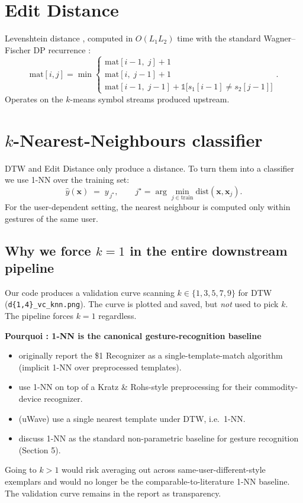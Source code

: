 \documentclass[11pt,a4paper]{article}
\newenvironment{whybox}[1]{%
    \begin{shaded*}\noindent\textbf{Pourquoi : #1}\par\vspace{0.3em}}
    {\end{shaded*}}
\renewenvironment{shaded*}
    {\definecolor{shadecolor}{named}{whyboxbg}\begin{shaded}}
    {\end{shaded}}
\begin{document}
\section{Edit Distance}

Levenshtein distance \cite{levenshtein1966edit}, computed in $O(L_1
L_2)$ time with the standard Wagner--Fischer DP recurrence
\cite{wagner1974string}:
\[
\text{mat}[i,j]=\min\begin{cases}
    \text{mat}[i{-}1,\;j]+1\\
    \text{mat}[i,\;j{-}1]+1\\
    \text{mat}[i{-}1,\;j{-}1]+ \mathbb{1}\!\bigl[s_1[i{-}1]\ne s_2[j{-}1]\bigr]
\end{cases}.
\]
Operates on the $k$-means symbol streams produced upstream.

\section{$k$-Nearest-Neighbours classifier}\label{sec:knn}

DTW and Edit Distance only produce a distance. To turn them into a
classifier we use 1-NN over the training set:
\[
\hat{y}(\mathbf{x}) \;=\; y_{\,j^\star}, \qquad
j^\star = \arg\min_{j\in\text{train}} \mathrm{dist}(\mathbf{x},\mathbf{x}_j).
\]
For the user-dependent setting, the nearest neighbour is computed only
within gestures of the same user.

\subsection{Why we force $k=1$ in the entire downstream pipeline}

Our code produces a validation curve scanning
$k\in\{1,3,5,7,9\}$ for DTW (\texttt{d\{1,4\}\_vc\_knn.png}). The
curve is plotted and saved, but \emph{not} used to pick $k$. The
pipeline forces $k=1$ regardless.

\begin{whybox}{1-NN is the canonical gesture-recognition baseline}
\begin{itemize}[itemsep=0.1em,topsep=0.2em]
\item \cite{wobbrock2007dollar1} originally report the \$1 Recognizer as
      a single-template-match algorithm (implicit 1-NN over preprocessed
      templates).
\item \cite{mezari2018commodity} use 1-NN on top of a Kratz \& Rohs-style
      preprocessing for their commodity-device recognizer.
\item \cite{liu2009uwave} (uWave) use a single nearest template under
      DTW, i.e.\ 1-NN.
\item \cite{mitra2007survey} discuss 1-NN as the standard non-parametric
      baseline for gesture recognition (Section 5).
\end{itemize}
Going to $k>1$ would risk averaging out across same-user-different-style
exemplars and would no longer be the comparable-to-literature 1-NN
baseline. The validation curve remains in the report as transparency.
\end{whybox}
\end{document}
